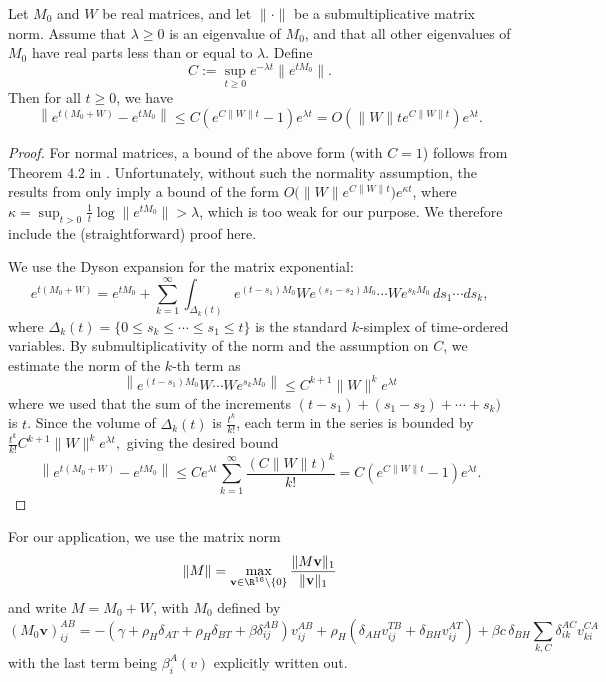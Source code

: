 \documentclass[11pt]{article}
\begin{document}
\begin{lemma}\label{lem:pert}
Let \( M_0 \) and \( W\) be real matrices, and let \( \| \cdot \| \) be a submultiplicative matrix norm. Assume that \( \lambda \geq 0 \) is an eigenvalue of \( M_0 \), and that all other eigenvalues of \( M_0 \) have real parts less than or equal to \( \lambda \). Define
\[
C := \sup_{t \geq 0} e^{-\lambda t} \| e^{tM_0} \|.
\]
Then for all \( t \geq 0 \), we have
\[
\left\| e^{t(M_0 + W)} - e^{tM_0} \right\| \leq C  \left( e^{C \|W\|t} - 1 \right) e^{\lambda t}=O\left(\|W\|{t}e^{C \|W\|t}\right) e^{\lambda t}.
\]
\end{lemma}




\begin{proof}
For normal matrices, a bound of the above form (with $C=1$) follows from  Theorem 4.2 in \cite{van1977sensitivity}.  Unfortunately, without such the normality assumption, the results from \cite{van1977sensitivity} only imply a  bound of the form $O\big(\|W\|e^{C \|W\|t}\big)e^{\kappa t}$, where $\kappa = \sup_{t > 0} \frac{1}{t} \log \|e^{tM_0}\| > \lambda$, which is too weak for our purpose.  We therefore include the (straightforward) proof here.  

We use the Dyson expansion for the matrix exponential:
\[
e^{t(M_0 + W)} = e^{tM_0} + \sum_{k=1}^\infty \int_{\Delta_k(t)} e^{(t - s_1)M_0} W e^{(s_1 - s_2)M_0} \cdots W e^{s_k M_0} \, ds_1 \cdots ds_k,
\]
where \( \Delta_k(t) = \{ 0 \leq s_k \leq \cdots \leq s_1 \leq t \} \) is the standard \( k \)-simplex of time-ordered variables.  
By submultiplicativity of the norm and the assumption on \( C \), we estimate the norm of the \( k \)-th term as
\[
\left\| e^{(t - s_1)M_0} W \cdots W e^{s_k M_0} \right\| 
\leq 
 C^{k+1} \|W\|^k e^{\lambda t}
\]
where we used that the sum of the increments $(t - s_1) + (s_1 - s_2) + \cdots + s_k) $ is $t$.
Since the volume of \( \Delta_k(t) \) is \( \frac{t^k}{k!} \),  each term in the series is bounded by
\( \frac{t^k}{k!} C^{k+1} \|W\|^k e^{\lambda t},\)
giving the desired bound
\[
\left\| e^{t(M_0 + W)} - e^{tM_0} \right\| 
\leq C e^{\lambda t} \sum_{k=1}^\infty \frac{(C \|W\| t)^k}{k!} 
= C \left( e^{C \|W\| t} - 1 \right) e^{\lambda t}.
\]
\end{proof}

For our application,
we use the matrix norm
$$
\|M\|=\max_{\mathbf v\in \R^{16}\setminus\{0\}}
\frac{\|M \mathbf v\|_1}{\|\mathbf v\|_1}
$$
and write $M=M_0+W$, with 
 $M_0$ defined by
\begin{equation}\label{M0-def}
(M_0 \mathbf v)_{ij}^{AB}=
 -\left(\gamma+\rho_H\delta_{AT}+\rho_H\delta_{BT}+\beta \delta_{ij}^{AB}\right)v_{ij}^{AB}
+\rho_H\left(\delta_{AH}v_{ij}^{T B}+\delta_{BH}v_{ij}^{AT}\right)
+\beta c \,\delta_{BH}\sum_{k,C}\delta_{ik}^{AC}v_{ki}^{CA}
\end{equation}
with the last term being $\beta_i^A(v)$ explicitly written out.
\end{document}
